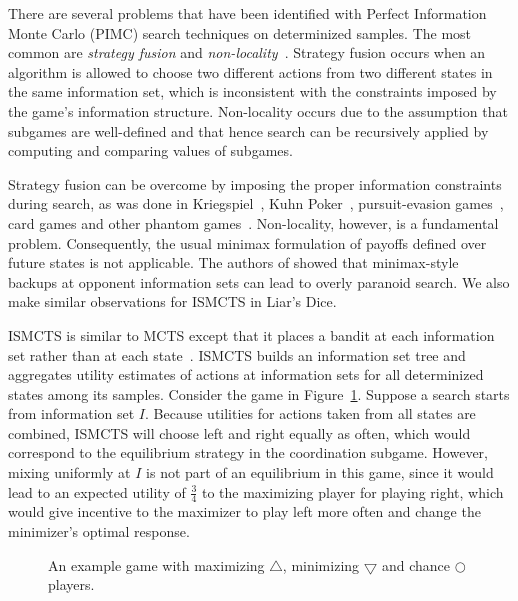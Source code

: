 \documentclass[letterpaper]{article}
\begin{document}

There are several problems that have been identified with Perfect Information Monte Carlo (PIMC) search techniques
on determinized samples. The most common are {\it strategy fusion} and {\it non-locality}~\cite{Frank98Finding}.
Strategy fusion occurs when an algorithm is allowed to choose two different actions from two different states in the same 
information set, which is inconsistent with the constraints imposed by the game's information structure. 
Non-locality occurs due to the assumption that subgames are well-defined and that hence search can be 
recursively applied by computing and comparing values of subgames. 

Strategy fusion can be overcome by imposing the proper information constraints during search, as was done in 
Kriegspiel~\cite{Ciancarini10Kriegspiel}, Kuhn Poker~\cite{Ponsen11Computing}, pursuit-evasion games~\cite{Lisy12peg}, 
card games and other phantom games~\cite{Cowling12ISMCTS}. 
Non-locality, however, is a fundamental problem.
Consequently, the usual minimax formulation of payoffs defined over future states is not applicable.  
The authors of \cite{Parker10iss,Parker06Overconfidence} showed that minimax-style backups at opponent information 
sets can lead to overly paranoid search. 
We also make similar observations for ISMCTS in Liar's Dice. 

ISMCTS is similar to MCTS except that it places a bandit at each information set rather than at each 
state~\cite{Cowling12ISMCTS}. ISMCTS builds an information set tree and aggregates utility estimates of actions 
at information sets for all determinized states among its samples. 
Consider the game in Figure~\ref{fig:coordGame}. 
Suppose a search starts from information set $I$. Because utilities for actions taken from all states are combined, 
ISMCTS will choose left and right equally as often, which would correspond to the equilibrium 
strategy in the coordination subgame. However, mixing uniformly at $I$ is not part of an equilibrium in this game, since
it would lead to an expected utility of $\frac{3}{4}$ to the maximizing player for playing right, which 
would give incentive to the maximizer to play left more often and change the minimizer's optimal response.  

\begin{figure}
\begin{center}
\end{center}
\caption{An example game with maximizing $\bigtriangleup$, minimizing $\bigtriangledown$ and chance $\bigcirc$ players.}\label{fig:coordGame}
\end{figure}
\end{document}
